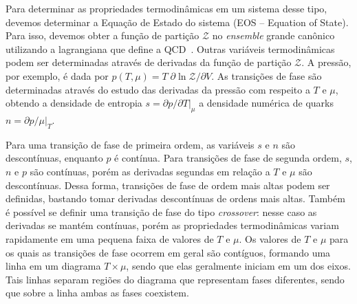 %

Para determinar as propriedades termodinâmicas em um sistema desse tipo, devemos determinar a Equação de Estado do sistema (EOS -- Equation of State). Para isso, devemos obter a função de partição $\mathcal{Z}$ no \emph{ensemble} grande canônico utilizando a lagrangiana que define a QCD~\parencite{Rischke}. Outras variáveis termodinâmicas podem ser determinadas através de derivadas da função de partição $\mathcal{Z}$. A pressão, por exemplo, é dada por $p(T, \mu) = T\;\partial \ln \mathcal{Z} / \partial V$. As transições de fase são determinadas através do estudo das derivadas da pressão com respeito a $T$ e $\mu$, obtendo a densidade de entropia $s = \partial p / \partial T|_\mu$ a densidade numérica de quarks~$n = \partial p / \mu|_T$.

Para uma transição de fase de primeira ordem, as variáveis $s$ e $n$ são descontínuas, enquanto $p$ é contínua. Para transições de fase de segunda ordem, $s$, $n$ e $p$ são contínuas, porém as derivadas segundas em relação a $T$ e $\mu$ são descontínuas. Dessa forma, transições de fase de ordem mais altas podem ser definidas, bastando tomar derivadas descontínuas de ordens mais altas. Também é possível se definir uma transição de fase do tipo \emph{crossover}: nesse caso as derivadas se mantém contínuas, porém as propriedades termodinâmicas variam rapidamente em uma pequena faixa de valores de $T$ e $\mu$. Os valores de $T$ e $\mu$ para os quais as transições de fase ocorrem em geral são contíguos, formando uma linha em um diagrama $T\times\mu$, sendo que elas geralmente iniciam em um dos eixos. Tais linhas separam regiões do diagrama que representam fases diferentes, sendo que sobre a linha ambas as fases coexistem.

